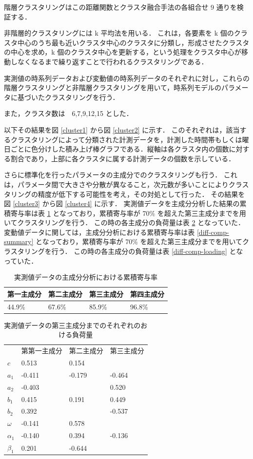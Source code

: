 \documentclass[a4j]{jarticle}
\begin{document}
階層クラスタリングはこの距離関数とクラスタ融合手法の各組合せ 9 通りを検証する．

非階層的クラスタリングには k 平均法を用いる．
これは，各要素を k 個のクラスタ中心のうち最も近いクラスタ中心のクラスタに分類し，形成させたクラスタの中心を求め，k 個のクラスタ中心を更新する，という処理をクラスタ中心が移動しなくなるまで繰り返すことで行われるクラスタリングである．

実測値の時系列データおよび変動値の時系列データのそれぞれに対し，これらの階層クラスタリングと非階層クラスタリングを用いて，時系列モデルのパラメータに基づいたクラスタリングを行う．

また，クラスタ数は　6,7,9,12,15 とした．

以下その結果を図 \ref{cluster1} から図 \ref{cluster2} に示す．
このそれぞれは，該当するクラスタリングによって分類された計測データを，計測した時間帯もしくは曜日ごとに色分けした積み上げ棒グラフである．縦軸は各クラスタ内の個数に対する割合であり，上部に各クラスタに属する計測データの個数を示している．

さらに標準化を行ったパラメータの主成分でのクラスタリングも行う．
これは，パラメータ間で大きさや分散が異なること，次元数が多いことによりクラスタリングの精度が低下する可能性を考え，その対処として行った．
その結果を図 \ref{cluster3} から図 \ref{cluster4} に示す．
実測値データを主成分分析した結果の累積寄与率は表 \ref{norm-comp-summary} となっており，累積寄与率が 70\% を超えた第三主成分までを用いてクラスタリングを行う．
この時の各主成分の負荷量は表 \ref{norm-comp-loading} となっていた．
変動値データに関しては，主成分分析における累積寄与率は表 \ref{diff-comp-summary} となっており，累積寄与率が 70\% を超えた第三主成分までを用いてクラスタリングを行う．
この時の各主成分の負荷量は表 \ref{diff-comp-loading} となっていた．

\begin{table}[tb]
\centering
\caption{実測値データの主成分分析における累積寄与率}
\label{norm-comp-summary}
\begin{tabular}{|l|l|l|l|}
\hline
第一主成分&第二主成分&第三主成分&第四主成分\\
\hline
44.9\%&67.6\%&85.9\%&96.8\%\\
\hline
\end{tabular}
\end{table}

\begin{table}[tb]
\centering
\caption{実測値データの第三主成分までのそれぞれのおける負荷量}
\label{norm-comp-loading}
\begin{tabular}{|l|l|l|l|}
\hline
&第第一主成分&第二主成分&第三主成分\\
$c$&0.513&0.154& \\
$a_1$&-0.411&-0.179&-0.464\\
$a_2$&-0.403& &0.520\\
$b_1$&0.415&0.191&0.449\\
$b_2$&0.392& &-0.537\\
$\omega$&-0.141&0.578& \\
$\alpha_1$&-0.140&0.394&-0.136\\
$\beta_1$&0.201&-0.644& \\
\hline
\end{tabular}
\end{table}
\end{document}
